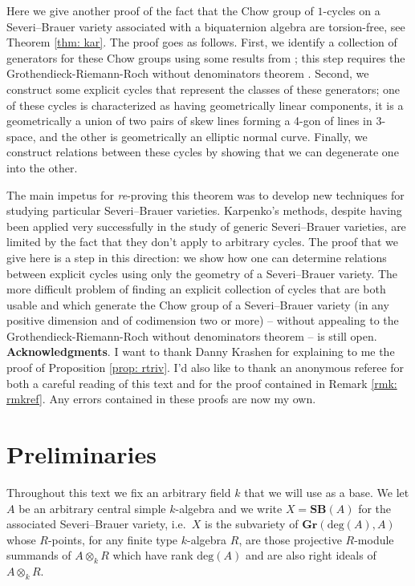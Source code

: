 \documentclass[12pt]{amsart}
\theoremstyle{definition}
\newcommand{\SB}{\mathbf{SB}}
\begin{document}
Here we give another proof of the fact that the Chow group of $1$-cycles on a Severi--Brauer variety associated with a biquaternion algebra are torsion-free, see Theorem \ref{thm: kar}. The proof goes as follows. First, we identify a collection of generators for these Chow groups using some results from \cite{MR4280495}; this step requires the Grothendieck-Riemann-Roch without denominators theorem \cite[Example 15.3.6]{MR1644323}. Second, we construct some explicit cycles that represent the classes of these generators; one of these cycles is characterized as having geometrically linear components, it is a geometrically a union of two pairs of skew lines forming a 4-gon of lines in 3-space, and the other is geometrically an elliptic normal curve. Finally, we construct relations between these cycles by showing that we can degenerate one into the other.

The main impetus for \textit{re}-proving this theorem was to develop new techniques for studying particular Severi--Brauer varieties. Karpenko's methods, despite having been applied very successfully in the study of generic Severi--Brauer varieties, are limited by the fact that they don't apply to arbitrary cycles. The proof that we give here is a step in this direction: we show how one can determine relations between explicit cycles using only the geometry of a Severi--Brauer variety. The more difficult problem of finding an explicit collection of cycles that are both usable and which generate the Chow group of a Severi--Brauer variety (in any positive dimension and of codimension two or more) -- without appealing to the Grothendieck-Riemann-Roch without denominators theorem -- is still open.\\

\noindent\textbf{Acknowledgments}. I want to thank Danny Krashen for explaining to me the proof of Proposition \ref{prop: rtriv}. I'd also like to thank an anonymous referee for both a careful reading of this text and for the proof contained in Remark \ref{rmk: rmkref}. Any errors contained in these proofs are now my own.

\section{Preliminaries}\label{sec: pre}
Throughout this text we fix an arbitrary field $k$ that we will use as a base. We let $A$ be an arbitrary central simple $k$-algebra and we write $X=\SB(A)$ for the associated Severi--Brauer variety, i.e.\ $X$ is the subvariety of $\mathbf{Gr}(\mathrm{deg}(A),A)$ whose $R$-points, for any finite type $k$-algebra $R$, are those projective $R$-module summands of $A\otimes_k R$ which have rank $\mathrm{deg}(A)$ and are also right ideals of $A\otimes_k R$.
\end{document}
